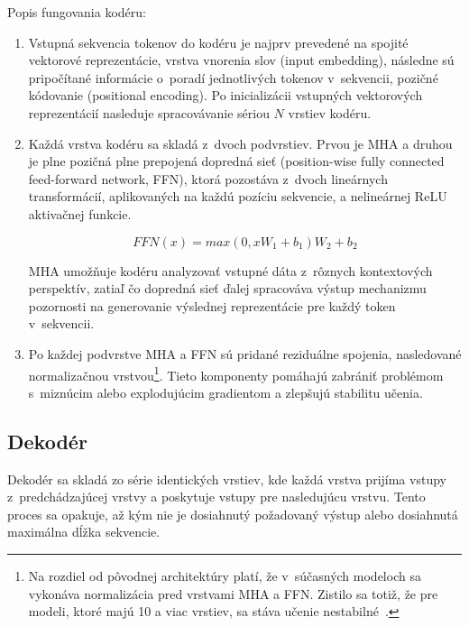 \noindent Popis fungovania kodéru:
\begin{enumerate}
    \item Vstupná sekvencia tokenov do kodéru je najprv prevedené na spojité vektorové reprezentácie, vrstva vnorenia slov (input embedding), následne sú pripočítané informácie o~poradí jednotlivých tokenov v~sekvencii, pozičné kódovanie (positional encoding). Po inicializácii vstupných vektorových reprezentácií nasleduje spracovávanie sériou $N$ vrstiev kodéru.

    \item Každá vrstva kodéru sa skladá z~dvoch podvrstiev. Prvou je MHA a druhou je plne pozičná plne prepojená dopredná sieť (position-wise fully connected feed-forward network, FFN), ktorá pozostáva z~dvoch lineárnych transformácií, aplikovaných na každú pozíciu sekvencie, a nelineárnej ReLU aktivačnej funkcie.

    \begin{equation}
        FFN(x) = max(0, xW_1 + b_1)W_2+b_2
    \end{equation}
    
    MHA umožňuje kodéru analyzovať vstupné dáta z~rôznych kontextových perspektív, zatiaľ čo dopredná sieť ďalej spracováva výstup mechanizmu pozornosti na generovanie výslednej reprezentácie pre každý token v~sekvencii.

    \item Po každej podvrstve MHA a FFN sú pridané reziduálne spojenia, nasledované normalizačnou vrstvou\footnote{Na rozdiel od pôvodnej architektúry platí, že v~súčasných modeloch sa vykonáva normalizácia pred vrstvami MHA a FFN. Zistilo sa totiž, že pre modeli, ktoré majú 10 a viac vrstiev, sa stáva učenie nestabilné~\cite{takase2023b2t}.}. Tieto komponenty pomáhajú zabrániť problémom s~miznúcim alebo explodujúcim gradientom a zlepšujú stabilitu učenia.
\end{enumerate}

\subsection{Dekodér}

Dekodér sa skladá zo série identických vrstiev, kde každá vrstva prijíma vstupy z~predchádzajúcej vrstvy a poskytuje vstupy pre nasledujúcu vrstvu. Tento proces sa opakuje, až kým nie je dosiahnutý požadovaný výstup alebo dosiahnutá maximálna dĺžka sekvencie.

